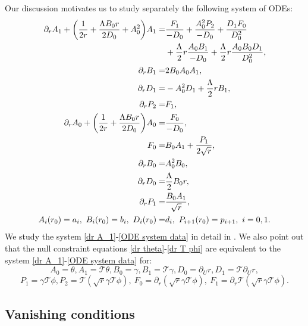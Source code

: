 \documentclass[11pt]{article}
\numberwithin{equation}{section}
\begin{document}
Our discussion motivates us to study separately the following system of ODEs:
\begin{align}
    \partial_rA_1+\bigg(\frac{1}{2r}+\frac{\Lambda B_0 r}{2D_0}+A_0^2\bigg)A_1=&\frac{F_1}{-D_0}+\frac{A_0^2P_2}{-D_0}+\frac{D_1F_0}{D_0^2}\label{dr A_1}\\&+\frac{\Lambda}{2}r\frac{A_0B_1}{-D_0}+\frac{\Lambda}{2}r\frac{A_0B_0D_1}{D_0^2},\notag\\
    \partial_rB_1=&2B_0 A_0 A_1,\label{dr B_1}\\
    \partial_rD_1=& -A_0^2D_1+\frac{\Lambda}{2}rB_1,\label{dr D_1}\\
    \partial_rP_2=&F_1,\label{dr P_2}\\
    \partial_rA_0+\bigg(\frac{1}{2r}+\frac{\Lambda B_0 r}{2D_0}\bigg)A_0=& \frac{F_0}{-D_0},\label{dr A_0}\\
    F_0=&B_0A_1+\frac{P_1}{2\sqrt{r}},\label{F_0}\\
    \partial_rB_0=& A_0^2B_0,\label{dr B_0}\\
    \partial_rD_0=& \frac{\Lambda}{2}B_0 r,\label{dr D_0}\\
    \partial_rP_1=&\frac{B_0A_1}{\sqrt{r}},\label{dr P_1}\\
    A_i(r_0)=a_i,\ B_i(r_0)=b_i,\ D_i(r_0)=&d_i,\ P_{i+1}(r_0)=p_{i+1},\ i=0,1.\label{ODE system data}
\end{align}
We study the system \eqref{dr A_1}-\eqref{ODE system data} in detail in . We also point out that the null constraint equations \eqref{dr theta}-\eqref{dr T phi} are equivalent to the system \eqref{dr A_1}-\eqref{ODE system data} for:
\[A_0=\theta,A_1=\mathcal{T}\theta,B_0=\gamma,B_1=\mathcal{T}\gamma,D_0=\partial_Ur,D_1=\mathcal{T}\partial_Ur,\]\[P_1=\gamma\mathcal{T}\phi, P_2=\mathcal{T}(\sqrt{r}\gamma\mathcal{T\phi}),\ F_0=\partial_r(\sqrt{r}\gamma\mathcal{T\phi}),\ F_1=\partial_r\mathcal{T}(\sqrt{r}\gamma\mathcal{T\phi}).\]

\subsection{Vanishing conditions}\label{vanishing section}
\end{document}
